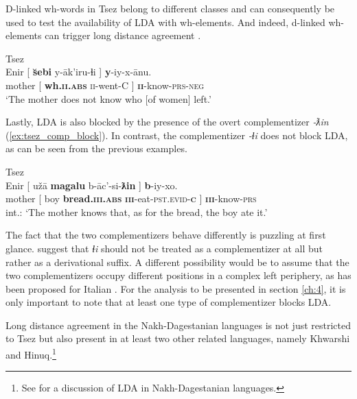 \documentclass[output=paper
,modfonts
,nonflat]{langsci/langscibook}
\begin{document}
D-linked wh-words in Tsez belong to different classes and can consequently be used to test the availability of LDA with wh-elements. And indeed, d-linked wh-elements can trigger long distance agreement .
\begin{exe}
	\ex Tsez \citep[][fn. 20]{Polinsky_Potsdam2001} \label{ex:tsez_wh_dlinked}\\
		\gll Enir [ \textbf{\u{s}ebi} y-\=ak'iru-ɬi ] \textbf{y}-iy-x-\={a}nu.\\
			 mother [ \textbf{wh.\textsc{ii.abs}} \textsc{ii}-went-C ] \textbf{\textsc{ii}}-know-\textsc{prs-neg}\\
		\glt `The mother does not know who [of women] left.'
\end{exe}
Lastly, LDA is also blocked by the presence of the overt complementizer \textit{-ƛin} (\ref{ex:tsez_comp_block}). In contrast, the complementizer \textit{-ɬi} does not block LDA, as can be seen from the previous examples.
\begin{exe}
	\ex Tsez \citep[][635]{Polinsky_Potsdam2001}\label{ex:tsez_comp_block}\\
		\gll *Enir [ u\v{z}\=a \textbf{magalu} b-\=ac’-si-\textbf{ƛin} ] \textbf{b}-iy-xo.\\
			 mother [ boy \textbf{bread.\textsc{\textbf{iii}.abs}} \textsc{\textbf{iii}}-eat-\textsc{pst.evid}-\textsc{\textbf{c}} ]	\textsc{\textbf{iii}}-know-\textsc{prs}\\
		\glt int.: `The mother knows that, as for the bread, the boy ate it.'
\end{exe}
The fact that the two complementizers behave differently is puzzling at first glance. \citet[][fn 19]{Polinsky_Potsdam2001} suggest that \textit{ɬi} should not be treated as a complementizer at all but rather as a derivational suffix. A different possibility would be to assume that the two complementizers occupy different positions in a complex left periphery, as has been proposed for Italian \citep{Ledgeway2005}. For the analysis to be presented in section \ref{ch:4}, it is only important to note that at least one type of complementizer blocks LDA.

Long distance agreement in the Nakh-Dagestanian languages is not just restricted to Tsez but also present in at least two other related languages, namely Khwarshi and Hinuq.\footnote{See  for a discussion of LDA in Nakh-Dagestanian languages.}
\end{document}
